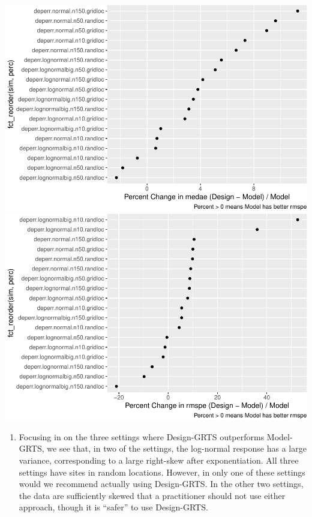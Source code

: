 \documentclass[]{elsarticle} %
\providecommand{\tightlist}{%
  \setlength{\itemsep}{0pt}\setlength{\parskip}{0pt}}
\begin{document}
\includegraphics{SpatialDVM_Manuscript_files/figure-latex/unnamed-chunk-5-1.pdf}
\includegraphics{SpatialDVM_Manuscript_files/figure-latex/unnamed-chunk-5-2.pdf}

\begin{enumerate}
\def\labelenumi{\arabic{enumi}.}
\setcounter{enumi}{2}
\tightlist
\item
  Focusing in on the three settings where Design-GRTS outperforms
  Model-GRTS, we see that, in two of the settings, the log-normal
  response has a large variance, corresponding to a large right-skew
  after exponentiation. All three settings have sites in random
  locations. However, in only one of these settings would we recommend
  actually using Design-GRTS. In the other two settings, the data are
  sufficiently skewed that a practitioner should not use either
  approach, though it is ``safer'' to use Design-GRTS.
\end{enumerate}
\end{document}
